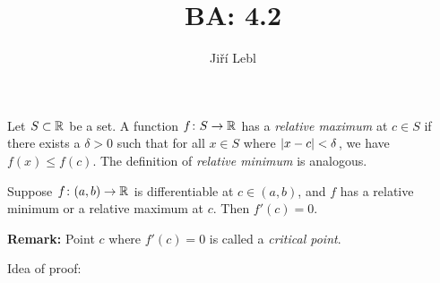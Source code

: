 \documentclass[10pt,aspectratio=169]{beamer}
\author{Ji\v{r}\'i Lebl}
\institute[OSU]{%
Departemento pri Matematiko de Oklahoma {\^S}tata Universitato}
\title{BA: 4.2}
\date{}
\begin{document}
\begin{frame}
\titlepage
\end{frame}

\begin{frame}
\begin{definition}
Let $S \subset {\mathbb{R}}$ be a set.
A function
$f \colon S \to {\mathbb{R}}$ has a \emph{relative maximum}
at $c \in S$ if there exists a $\delta>0$
such that for all $x \in S$ where $\left\lvert {x-c} \right\rvert < \delta$,
we have $f(x) \leq f(c)$.
\pause
The definition of
\emph{relative minimum}
is analogous.
\end{definition}

\pause
\begin{lemma}
Suppose $f \colon (a,b) \to {\mathbb{R}}$ is differentiable at $c \in (a,b)$,
and $f$ has
a relative minimum or a relative maximum at $c$.  Then
$f'(c) = 0$.
\end{lemma}

\pause
\textbf{Remark:}  Point $c$ where $f'(c)=0$ is called a
\emph{critical point}.

\pause
\medskip

Idea of proof:

\vspace*{-12pt}
\phantom{Idea of proof:~~~~}

\end{frame}
\end{document}
